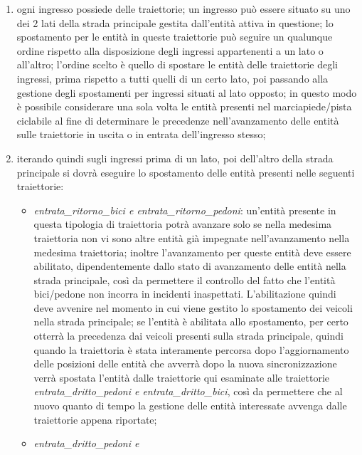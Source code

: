 \begin{enumerate}
\begin{enumerate}
\item ogni ingresso possiede delle traiettorie; un ingresso può essere situato su uno dei 2 lati della strada principale gestita dall'entità attiva in questione; lo spostamento per le entità in queste traiettorie può seguire un qualunque ordine rispetto alla disposizione degli ingressi appartenenti a un lato o all'altro; l'ordine scelto è quello di spostare le entità delle traiettorie degli ingressi, prima rispetto a tutti quelli di un certo lato, poi passando alla gestione degli spostamenti per ingressi situati al lato opposto; in questo modo è possibile considerare una sola volta le entità presenti nel marciapiede/pista ciclabile al fine di determinare le precedenze nell'avanzamento delle entità sulle traiettorie in uscita o in entrata dell'ingresso stesso;
\item iterando quindi sugli ingressi prima di un lato, poi dell'altro della strada principale si dovrà eseguire lo spostamento delle entità presenti nelle seguenti traiettorie:
\begin{itemize}
\item \textit{en\-tra\-ta\_ri\-tor\-no\_bi\-ci e en\-tra\-ta\_ri\-tor\-no\_pe\-do\-ni}: un'entità presente in questa tipologia di traiettoria potrà avanzare solo se nella medesima traiettoria non vi sono altre entità già impegnate nell'avanzamento nella medesima traiettoria; inoltre l'avanzamento per queste entità deve essere abilitato, dipendentemente dallo stato di avanzamento delle entità nella strada principale, così da permettere il controllo del fatto che l'entità bici/pedone non incorra in incidenti inaspettati. L'abilitazione quindi deve avvenire nel momento in cui viene gestito lo spostamento dei veicoli nella strada principale; se l'entità è abilitata allo spostamento, per certo otterrà la precedenza dai veicoli presenti sulla strada principale, quindi quando la traiettoria è stata interamente percorsa dopo l'aggiornamento delle posizioni delle entità che avverrà dopo la nuova sincronizzazione verrà spostata l'entità dalle traiettorie qui esaminate alle traiettorie \textit{en\-tra\-ta\_drit\-to\_pe\-do\-ni e en\-tra\-ta\_drit\-to\_bi\-ci}, così da permettere che al nuovo quanto di tempo la gestione delle entità interessate avvenga dalle traiettorie appena riportate;
\item \textit{en\-tra\-ta\_drit\-to\_pe\-do\-ni e
}
\end{itemize}
\end{enumerate}
\end{enumerate}
